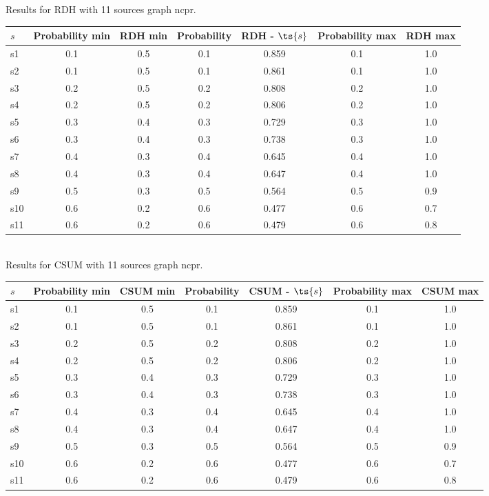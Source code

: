 \documentclass{article}
\begin{document}
\noindent Results for RDH with 11 sources graph ncpr.

\noindent\begin{tabular}{|l|c|c|c|c|c|c|}
\hline
$s$& Probability min & RDH min & Probability & RDH - $\ts{s}$ & Probability max & RDH max\\
\hline
s1 &0.1 & 0.5 & 0.1 & 0.859 & 0.1 & 1.0\\
\hline
s2 &0.1 & 0.5 & 0.1 & 0.861 & 0.1 & 1.0\\
\hline
s3 &0.2 & 0.5 & 0.2 & 0.808 & 0.2 & 1.0\\
\hline
s4 &0.2 & 0.5 & 0.2 & 0.806 & 0.2 & 1.0\\
\hline
s5 &0.3 & 0.4 & 0.3 & 0.729 & 0.3 & 1.0\\
\hline
s6 &0.3 & 0.4 & 0.3 & 0.738 & 0.3 & 1.0\\
\hline
s7 &0.4 & 0.3 & 0.4 & 0.645 & 0.4 & 1.0\\
\hline
s8 &0.4 & 0.3 & 0.4 & 0.647 & 0.4 & 1.0\\
\hline
s9 &0.5 & 0.3 & 0.5 & 0.564 & 0.5 & 0.9\\
\hline
s10 &0.6 & 0.2 & 0.6 & 0.477 & 0.6 & 0.7\\
\hline
s11 &0.6 & 0.2 & 0.6 & 0.479 & 0.6 & 0.8\\
\hline
\end{tabular}\\

\noindent Results for CSUM with 11 sources graph ncpr.

\noindent\begin{tabular}{|l|c|c|c|c|c|c|}
\hline
$s$& Probability min & CSUM min & Probability & CSUM - $\ts{s}$ & Probability max & CSUM max\\
\hline
s1 &0.1 & 0.5 & 0.1 & 0.859 & 0.1 & 1.0\\
\hline
s2 &0.1 & 0.5 & 0.1 & 0.861 & 0.1 & 1.0\\
\hline
s3 &0.2 & 0.5 & 0.2 & 0.808 & 0.2 & 1.0\\
\hline
s4 &0.2 & 0.5 & 0.2 & 0.806 & 0.2 & 1.0\\
\hline
s5 &0.3 & 0.4 & 0.3 & 0.729 & 0.3 & 1.0\\
\hline
s6 &0.3 & 0.4 & 0.3 & 0.738 & 0.3 & 1.0\\
\hline
s7 &0.4 & 0.3 & 0.4 & 0.645 & 0.4 & 1.0\\
\hline
s8 &0.4 & 0.3 & 0.4 & 0.647 & 0.4 & 1.0\\
\hline
s9 &0.5 & 0.3 & 0.5 & 0.564 & 0.5 & 0.9\\
\hline
s10 &0.6 & 0.2 & 0.6 & 0.477 & 0.6 & 0.7\\
\hline
s11 &0.6 & 0.2 & 0.6 & 0.479 & 0.6 & 0.8\\
\hline
\end{tabular}\\
\end{document}
